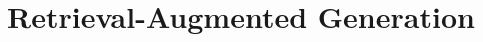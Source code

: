 \documentclass[english,master]{swsLeipzig}
\begin{document}
\section{Retrieval-Augmented Generation}\label{rag}



\end{document}
